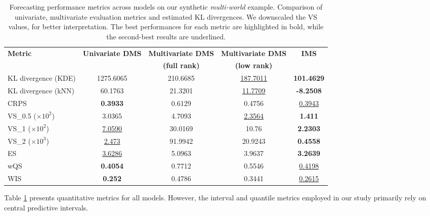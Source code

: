 \documentclass[a4paper,oneside,bibliography=totoc]{scrbook}
\begin{document}
\begin{table}[htbp]
\caption{Forecasting performance metrics across models on our synthetic \textit{multi-world} example. Comparison of univariate, multivariate evaluation metrics and estimated KL divergences. We downscaled the VS values, for better interpretation.
The best performances for each metric are highlighted in bold, while the second-best results are underlined.}
\centering
\footnotesize
\setlength{\tabcolsep}{3pt}
\renewcommand{\arraystretch}{1.2}
\begin{adjustbox}{center}
\begin{tabular}{lcccc}
\toprule
\textbf{Metric} & \textbf{Univariate DMS} & \textbf{Multivariate DMS} & \textbf{Multivariate DMS} & \textbf{IMS}\\
& & \textbf{(full rank)} & \textbf{(low rank)} &\\
\midrule
KL divergence (KDE) & 1275.6065 & 210.6685 & \underline{187.7011} & \textbf{101.4629}\\
KL divergence (kNN) & 60.1763 & 21.3201 & \underline{11.7709} & \textbf{-8.2508}\\
CRPS            & \textbf{0.3933} & 0.6129 & 0.4756 & \underline{0.3943} \\
VS\_0.5 ($\times 10^{2}$) & 3.0365 & 4.7093 & \underline{2.3564} & \textbf{1.411} \\
VS\_1 ($\times 10^{2}$)   & \underline{7.0590} & 30.0169 & 10.76 & \textbf{2.2303} \\
VS\_2 ($\times 10^{3}$)   & \underline{2.473} & 91.9942 & 20.9243 & \textbf{0.4558} \\
ES              & \underline{3.6286} & 5.0963 & 3.9637 & \textbf{3.2639} \\
wQS             & \textbf{0.4054} & 0.7712 & 0.5546 & \underline{0.4198} \\
WIS             & \textbf{0.252} & 0.4786 & 0.3441 & \underline{0.2615} \\
\bottomrule
\end{tabular}
\end{adjustbox}
\label{tab:sw_metrics}
\end{table}
Table \ref{tab:sw_metrics} presents quantitative metrics for all models.
However, the interval and quantile metrics employed in our study primarily rely on central predictive intervals. %
\end{document}
